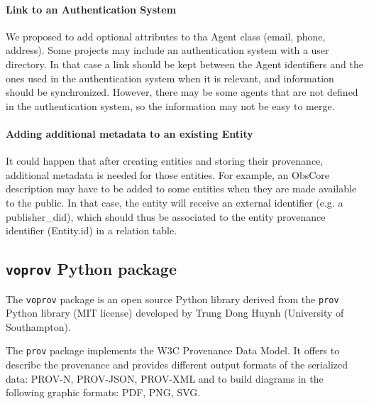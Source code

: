 \paragraph{Link to an Authentication System}
We proposed to add optional attributes to tha Agent class (email, phone, address). Some projects may include an authentication system with a user directory. In that case a link should be kept between the Agent identifiers and the ones used in the authentication system when it is relevant, and information should be synchronized. However, there may be some agents that are not defined in the authentication system, so the information may not be easy to merge.

\paragraph{Adding additional metadata to an existing Entity}
It could happen that after creating entities and storing their provenance, additional metadata is needed for those entities. For example, an ObsCore description may have to be added to some entities when they are made available to the public. In that case, the entity will receive an external identifier (e.g. a publisher\_did), which should thus be associated to the entity provenance identifier (Entity.id) in a relation table.

\subsection{\texttt{voprov} Python package}\label{sec:implementation_voprov}
The \texttt{voprov} package is an open source Python library derived from the \texttt{prov} Python
library (MIT license) developed by Trung Dong Huynh (University of
Southampton). 

The \texttt{prov} package implements the W3C Provenance Data Model.  It offers to
describe the provenance and provides different output formats of the serialized data: PROV-N, PROV-JSON, PROV-XML and to build diagrams in the following graphic formats: PDF, PNG, SVG.

